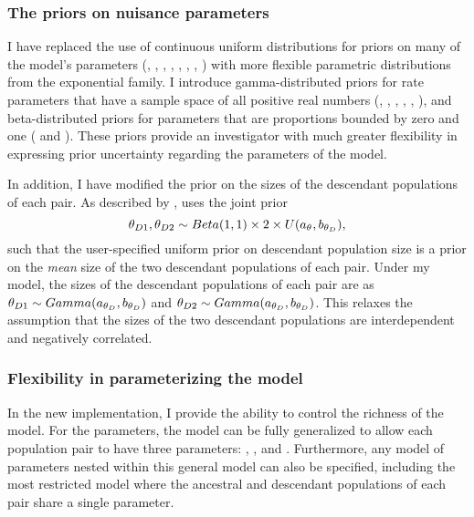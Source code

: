 \subsubsection{The priors on nuisance parameters}
I have replaced the use of continuous uniform distributions for priors on many
of the model's parameters (\divTime{}, \ancestralTheta{},
, , ,
, \recombinationRate, \migrationRate{}) with more flexible
parametric distributions from the exponential family.
I introduce gamma-distributed priors for rate parameters that have a sample
space of all positive real numbers (\divTime{}, \ancestralTheta{},
, , \recombinationRate,
\migrationRate{}), and beta-distributed priors for parameters that are
proportions bounded by zero and one ( and
).
These priors provide an investigator with much greater flexibility in
expressing prior uncertainty regarding the parameters of the model.

In addition, I have modified the prior on the sizes of the descendant
populations of each pair.
As described by \cite{Oaks2012}, \msb uses the joint prior
\begin{equation}
    \descendantTheta{1}{}, \descendantTheta{2}{} \sim
    Beta(1,1) \times 2 \times U(\uniformMin{\myTheta{}},
    \uniformMax{\descendantTheta{}{}}),
    \label{eq:jointThetaPrior}
\end{equation}
such that the user-specified uniform prior on descendant population
size is a prior on the \emph{mean} size of the two descendant
populations of each pair.
Under my model, the sizes of the descendant populations of each
pair are \iid as
$\descendantTheta{1}{} \sim Gamma(\gammaShape{\descendantTheta{}{}},
\gammaScale{\descendantTheta{}{}})$
and
$\descendantTheta{2}{} \sim Gamma(\gammaShape{\descendantTheta{}{}},
\gammaScale{\descendantTheta{}{}})$.
This relaxes the assumption that the sizes of the two descendant populations
are interdependent and negatively correlated.

\subsubsection{Flexibility in parameterizing the model}
In the new implementation, I provide the ability to control the richness of the
model.
For the \myTheta{} parameters, the model can be fully generalized to
allow each population pair to have three parameters:
\ancestralTheta{}, , and .
Furthermore, any model of \myTheta{} parameters nested within this
general model can also be specified, including the most restricted model
where the ancestral and descendant populations of each pair share
a single \myTheta{} parameter.

